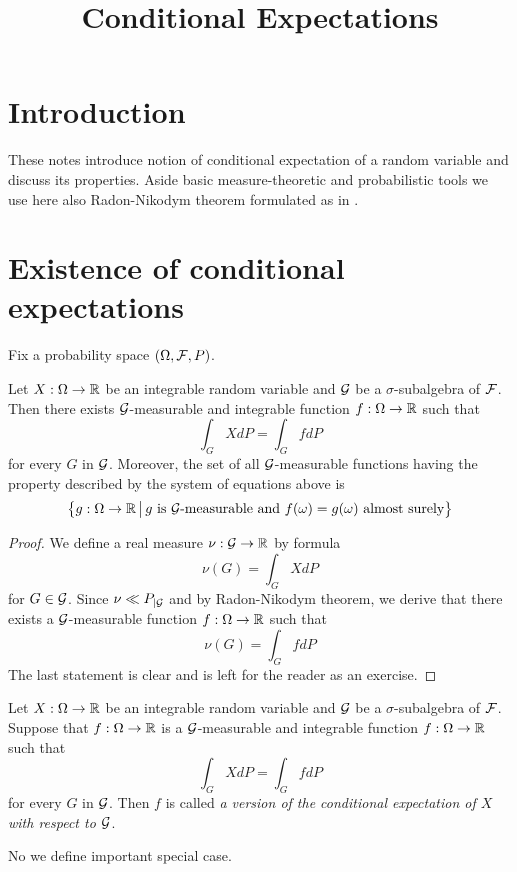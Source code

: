 



\title{Conditional Expectations}
\date{}
\maketitle
\section{Introduction}
These notes introduce notion of conditional expectation of a random variable and discuss its properties. Aside basic measure-theoretic and probabilistic tools we use here also Radon-Nikodym theorem formulated as in {\cite[Theorem 5.3]{RadonNikodymHahnJordanLebesguedecomposition}}.

\section{Existence of conditional expectations}
\noindent
Fix a probability space $(\Omega, {\mathcal F}, P)$.

\begin{theorem}\label{theorem:existenceofconditionalexpectationforintegrable}
Let $X:\Omega \rightarrow {\mathbb R}$ be an integrable random variable and ${\mathcal G}$ be a $\sigma$-subalgebra of ${\mathcal F}$. Then there exists ${\mathcal G}$-measurable and integrable function $f:\Omega \rightarrow {\mathbb R}$ such that
$$\int_GXdP = \int_G f dP$$
for every $G$ in ${\mathcal G}$. Moreover, the set of all ${\mathcal G}$-measurable functions having the property described by the system of equations above is
$$\big\{g:\Omega \rightarrow {\mathbb R}\,\big|\,g\mbox{ is }{\mathcal G}\mbox{-measurable and }f(\omega)=g(\omega)\mbox{ almost surely}\big\}$$
\end{theorem}
\begin{proof}
We define a real measure $\nu:{\mathcal G}\rightarrow {\mathbb R}$ by formula
$$\nu(G) = \int_G XdP$$
for $G\in {\mathcal G}$. Since $\nu \ll P_{\mid {\mathcal G}}$ and by Radon-Nikodym theorem, we derive that there exists a ${\mathcal G}$-measurable function $f:\Omega \rightarrow {\mathbb R}$ such that
$$\nu(G) = \int_G f dP$$
The last statement is clear and is left for the reader as an exercise.
\end{proof}

\begin{definition}
Let $X:\Omega \rightarrow {\mathbb R}$ be an integrable random variable and ${\mathcal G}$ be a $\sigma$-subalgebra of ${\mathcal F}$. Suppose that $f:\Omega \rightarrow {\mathbb R}$ is a ${\mathcal G}$-measurable and integrable function $f:\Omega \rightarrow {\mathbb R}$ such that 
$$\int_GXdP = \int_G f dP$$
for every $G$ in ${\mathcal G}$. Then $f$ is called \textit{a version of the conditional expectation of $X$ with respect to ${\mathcal G}$}.
\end{definition}
\noindent
No we define important special case.

